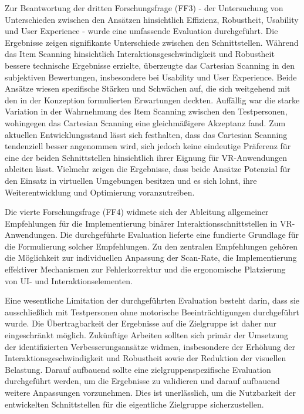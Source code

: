 Zur Beantwortung der dritten Forschungsfrage (FF3) - der Untersuchung von Unterschieden zwischen den Ansätzen hinsichtlich Effizienz, Robustheit, Usability und User Experience - wurde eine umfassende Evaluation durchgeführt. Die Ergebnisse zeigen signifikante Unterschiede zwischen den Schnittstellen. Während das Item Scanning hinsichtlich Interaktionsgeschwindigkeit und Robustheit bessere technische Ergebnisse erzielte, überzeugte das Cartesian Scanning in den subjektiven Bewertungen, insbesondere bei Usability und User Experience. Beide Ansätze wiesen spezifische Stärken und Schwächen auf, die sich weitgehend mit den in der Konzeption formulierten Erwartungen deckten. Auffällig war die starke Variation in der Wahrnehmung des Item Scanning zwischen den Testpersonen, wohingegen das Cartesian Scanning eine gleichmäßigere Akzeptanz fand. Zum aktuellen Entwicklungsstand lässt sich festhalten, dass das Cartesian Scanning tendenziell besser angenommen wird, sich jedoch keine eindeutige Präferenz für eine der beiden Schnittstellen hinsichtlich ihrer Eignung für VR-Anwendungen ableiten lässt. Vielmehr zeigen die Ergebnisse, dass beide Ansätze Potenzial für den Einsatz in virtuellen Umgebungen besitzen und es sich lohnt, ihre Weiterentwicklung und Optimierung voranzutreiben.

Die vierte Forschungsfrage (FF4) widmete sich der Ableitung allgemeiner Empfehlungen für die Implementierung binärer Interaktionsschnittstellen in VR-Anwendungen. Die durchgeführte Evaluation lieferte eine fundierte Grundlage für die Formulierung solcher Empfehlungen. Zu den zentralen Empfehlungen gehören die Möglichkeit zur individuellen Anpassung der Scan-Rate, die Implementierung effektiver Mechanismen zur Fehlerkorrektur und die ergonomische Platzierung von UI- und Interaktionselementen.

Eine wesentliche Limitation der durchgeführten Evaluation besteht darin, dass sie ausschließlich mit Testpersonen ohne motorische Beeinträchtigungen durchgeführt wurde. Die Übertragbarkeit der Ergebnisse auf die Zielgruppe ist daher nur eingeschränkt möglich. Zukünftige Arbeiten sollten sich primär der Umsetzung der identifizierten Verbesserungsansätze widmen, insbesondere der Erhöhung der Interaktionsgeschwindigkeit und Robustheit sowie der Reduktion der visuellen Belastung. Darauf aufbauend sollte eine zielgruppenspezifische Evaluation durchgeführt werden, um die Ergebnisse zu validieren und darauf aufbauend weitere Anpassungen vorzunehmen. Dies ist unerlässlich, um die Nutzbarkeit der entwickelten Schnittstellen für die eigentliche Zielgruppe sicherzustellen.

